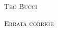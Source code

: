 

\hspace{1cm}
{\scshape\Large Teo Bucci}

\vspace{1cm}

\hspace{1cm}
{\scshape\huge \thetitle}

\vspace{0.4cm}

\hspace{1cm}
{\scshape\huge Errata corrige}


